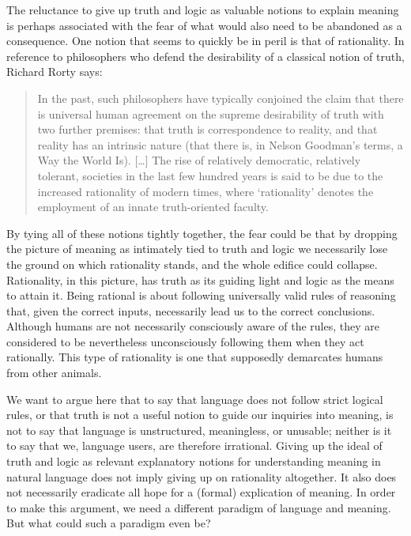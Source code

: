 \documentclass[a4paper]{article}
\begin{document}
The reluctance to give up truth and logic as valuable notions to explain meaning is perhaps associated with the fear of what would also need to be abandoned as a consequence.
One notion that seems to quickly be in peril is that of rationality.
In reference to philosophers who defend the desirability of a classical notion of truth, Richard Rorty says:
\begin{quote}
In the past, such philosophers have typically conjoined the claim that there is universal human agreement on the supreme desirability of truth with two further premises: that truth is correspondence to reality, and that reality has an intrinsic nature (that there is, in Nelson Goodman's terms, a Way the World Is).
[\ldots]
The rise of relatively democratic, relatively tolerant, societies in the last few hundred years is said to be due to the increased rationality of modern times, where `rationality' denotes the employment of an innate truth-oriented faculty.%
~\parencite*[1]{rorty_response_2000-1}
\end{quote}
By tying all of these notions tightly together, the fear could be that by dropping the picture of meaning as intimately tied to truth and logic we necessarily lose the ground on which rationality stands, and the whole edifice could collapse.
Rationality, in this picture, has truth as its guiding light and logic as the means to attain it.
Being rational is about following universally valid rules of reasoning that, given the correct inputs, necessarily lead us to the correct conclusions. %
Although humans are not necessarily consciously aware of the rules, they are considered to be nevertheless unconsciously following them when they act rationally.
This type of rationality is one that supposedly demarcates humans from other animals.

We want to argue here that to say that language does not follow strict logical rules, or that truth is not a useful notion to guide our inquiries into meaning, is not to say that language is unstructured, meaningless, or unusable; neither is it to say that we, language users, are therefore irrational.
Giving up the ideal of truth and logic as relevant explanatory notions for understanding meaning in natural language does not imply giving up on rationality altogether.
It also does not necessarily eradicate all hope for a (formal) explication of meaning.
In order to make this argument, we need a different paradigm of language and meaning.
But what could such a paradigm even be?
\end{document}
